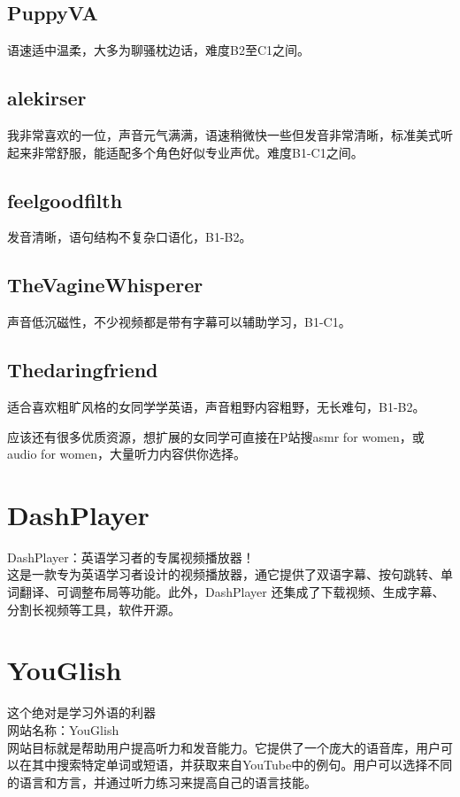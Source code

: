 \documentclass[11pt]{article}
\begin{document}
\subsection{PuppyVA}
\label{sec:orgaa5a9ef}
语速适中温柔，大多为聊骚枕边话，难度B2至C1之间。

\subsection{alekirser}
\label{sec:org049a1a6}
我非常喜欢的一位，声音元气满满，语速稍微快一些但发音非常清晰，标准美式听起来非常舒服，能适配多个角色好似专业声优。难度B1-C1之间。

\subsection{feelgoodfilth}
\label{sec:org6cc416c}
发音清晰，语句结构不复杂口语化，B1-B2。

\subsection{TheVagineWhisperer}
\label{sec:orgea17d86}
声音低沉磁性，不少视频都是带有字幕可以辅助学习，B1-C1。

\subsection{Thedaringfriend}
\label{sec:orgaa2c966}
适合喜欢粗旷风格的女同学学英语，声音粗野内容粗野，无长难句，B1-B2。

应该还有很多优质资源，想扩展的女同学可直接在P站搜asmr for women，或audio for women，大量听力内容供你选择。

\section{DashPlayer}
\label{sec:org4bbaa42}
DashPlayer：英语学习者的专属视频播放器！\\
这是一款专为英语学习者设计的视频播放器，通它提供了双语字幕、按句跳转、单词翻译、可调整布局等功能。此外，DashPlayer 还集成了下载视频、生成字幕、分割长视频等工具，软件开源。

\section{YouGlish}
\label{sec:orgfa73f0d}
这个绝对是学习外语的利器 \\
网站名称：YouGlish \\
网站目标就是帮助用户提高听力和发音能力。它提供了一个庞大的语音库，用户可以在其中搜索特定单词或短语，并获取来自YouTube中的例句。用户可以选择不同的语言和方言，并通过听力练习来提高自己的语言技能。\\
\end{document}
